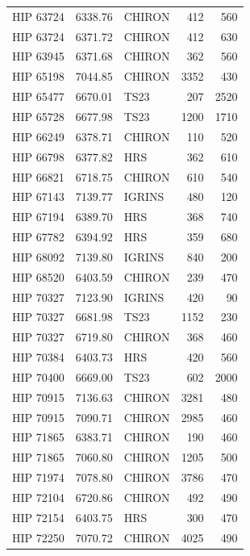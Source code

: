 \begin{scriptsize}
\begin{longtable}{|l|rlrr|}
   HIP 63724 &  6338.76 &     CHIRON &      412 &   560 \\
   HIP 63724 &  6371.72 &     CHIRON &      412 &   630 \\
   HIP 63945 &  6371.68 &     CHIRON &      362 &   560 \\
   HIP 65198 &  7044.85 &     CHIRON &     3352 &   430 \\
   HIP 65477 &  6670.01 &       TS23 &      207 &  2520 \\
   HIP 65728 &  6677.98 &       TS23 &     1200 &  1710 \\
   HIP 66249 &  6378.71 &     CHIRON &      110 &   520 \\
   HIP 66798 &  6377.82 &        HRS &      362 &   610 \\
   HIP 66821 &  6718.75 &     CHIRON &      610 &   540 \\
   HIP 67143 &  7139.77 &     IGRINS &      480 &   120 \\
   HIP 67194 &  6389.70 &        HRS &      368 &   740 \\
   HIP 67782 &  6394.92 &        HRS &      359 &   680 \\
   HIP 68092 &  7139.80 &     IGRINS &      840 &   200 \\
   HIP 68520 &  6403.59 &     CHIRON &      239 &   470 \\
   HIP 70327 &  7123.90 &     IGRINS &      420 &    90 \\
   HIP 70327 &  6681.98 &       TS23 &     1152 &   230 \\
   HIP 70327 &  6719.80 &     CHIRON &      368 &   460 \\
   HIP 70384 &  6403.73 &        HRS &      420 &   560 \\
   HIP 70400 &  6669.00 &       TS23 &      602 &  2000 \\
   HIP 70915 &  7136.63 &     CHIRON &     3281 &   480 \\
   HIP 70915 &  7090.71 &     CHIRON &     2985 &   460 \\
   HIP 71865 &  6383.71 &     CHIRON &      190 &   460 \\
   HIP 71865 &  7060.80 &     CHIRON &     1205 &   500 \\
   HIP 71974 &  7078.80 &     CHIRON &     3786 &   470 \\
   HIP 72104 &  6720.86 &     CHIRON &      492 &   490 \\
   HIP 72154 &  6403.75 &        HRS &      300 &   470 \\
   HIP 72250 &  7070.72 &     CHIRON &     4025 &   490 \\

\end{longtable}
\end{scriptsize}
